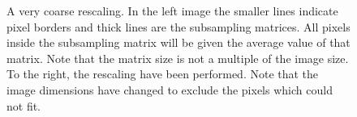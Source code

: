 \documentclass[a4paper, 10pt, final]{article}
\begin{document}
\begin{figure}[!h]
    \centering
    \hspace{1em}
    \caption{A very coarse rescaling. In the left image the smaller
    lines indicate pixel borders and thick lines are the subsampling
    matrices. All pixels inside the subsampling matrix will be given the
    average value of that matrix.  Note that the matrix size is not a
    multiple of the image size. To the right, the rescaling have been
    performed. Note that the image dimensions have changed to exclude
    the pixels which could not fit.}
    \label{lenagrid}
\end{figure}
\end{document}
